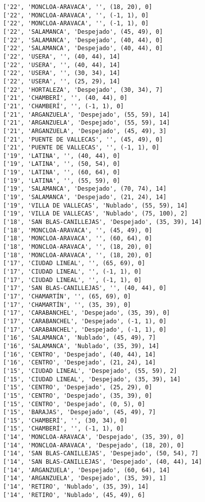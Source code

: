 \documentclass[11pt]{article}
\begin{document}
\begin{Verbatim}[commandchars=\\\{\}]
['22', 'MONCLOA-ARAVACA', '', (18, 20), 0]
['22', 'MONCLOA-ARAVACA', '', (-1, 1), 0]
['22', 'MONCLOA-ARAVACA', '', (-1, 1), 0]
['22', 'SALAMANCA', 'Despejado', (45, 49), 0]
['22', 'SALAMANCA', 'Despejado', (40, 44), 0]
['22', 'SALAMANCA', 'Despejado', (40, 44), 0]
['22', 'USERA', '', (40, 44), 14]
['22', 'USERA', '', (40, 44), 14]
['22', 'USERA', '', (30, 34), 14]
['22', 'USERA', '', (25, 29), 14]
['22', 'HORTALEZA', 'Despejado', (30, 34), 7]
['21', 'CHAMBERÍ', '', (40, 44), 0]
['21', 'CHAMBERÍ', '', (-1, 1), 0]
['21', 'ARGANZUELA', 'Despejado', (55, 59), 14]
['21', 'ARGANZUELA', 'Despejado', (55, 59), 14]
['21', 'ARGANZUELA', 'Despejado', (45, 49), 3]
['21', 'PUENTE DE VALLECAS', '', (45, 49), 0]
['21', 'PUENTE DE VALLECAS', '', (-1, 1), 0]
['19', 'LATINA', '', (40, 44), 0]
['19', 'LATINA', '', (50, 54), 0]
['19', 'LATINA', '', (60, 64), 0]
['19', 'LATINA', '', (55, 59), 0]
['19', 'SALAMANCA', 'Despejado', (70, 74), 14]
['19', 'SALAMANCA', 'Despejado', (21, 24), 14]
['19', 'VILLA DE VALLECAS', 'Nublado', (55, 59), 14]
['19', 'VILLA DE VALLECAS', 'Nublado', (75, 100), 2]
['18', 'SAN BLAS-CANILLEJAS', 'Despejado', (35, 39), 14]
['18', 'MONCLOA-ARAVACA', '', (45, 49), 0]
['18', 'MONCLOA-ARAVACA', '', (60, 64), 0]
['18', 'MONCLOA-ARAVACA', '', (18, 20), 0]
['18', 'MONCLOA-ARAVACA', '', (18, 20), 0]
['17', 'CIUDAD LINEAL', '', (65, 69), 0]
['17', 'CIUDAD LINEAL', '', (-1, 1), 0]
['17', 'CIUDAD LINEAL', '', (-1, 1), 0]
['17', 'SAN BLAS-CANILLEJAS', '', (40, 44), 0]
['17', 'CHAMARTÍN', '', (65, 69), 0]
['17', 'CHAMARTÍN', '', (35, 39), 0]
['17', 'CARABANCHEL', 'Despejado', (35, 39), 0]
['17', 'CARABANCHEL', 'Despejado', (-1, 1), 0]
['17', 'CARABANCHEL', 'Despejado', (-1, 1), 0]
['16', 'SALAMANCA', 'Nublado', (45, 49), 7]
['16', 'SALAMANCA', 'Nublado', (35, 39), 14]
['16', 'CENTRO', 'Despejado', (40, 44), 14]
['16', 'CENTRO', 'Despejado', (21, 24), 14]
['15', 'CIUDAD LINEAL', 'Despejado', (55, 59), 2]
['15', 'CIUDAD LINEAL', 'Despejado', (35, 39), 14]
['15', 'CENTRO', 'Despejado', (25, 29), 0]
['15', 'CENTRO', 'Despejado', (35, 39), 0]
['15', 'CENTRO', 'Despejado', (0, 5), 0]
['15', 'BARAJAS', 'Despejado', (45, 49), 7]
['15', 'CHAMBERÍ', '', (30, 34), 0]
['15', 'CHAMBERÍ', '', (-1, 1), 0]
['14', 'MONCLOA-ARAVACA', 'Despejado', (35, 39), 0]
['14', 'MONCLOA-ARAVACA', 'Despejado', (18, 20), 0]
['14', 'SAN BLAS-CANILLEJAS', 'Despejado', (50, 54), 7]
['14', 'SAN BLAS-CANILLEJAS', 'Despejado', (40, 44), 14]
['14', 'ARGANZUELA', 'Despejado', (60, 64), 14]
['14', 'ARGANZUELA', 'Despejado', (35, 39), 1]
['14', 'RETIRO', 'Nublado', (35, 39), 14]
['14', 'RETIRO', 'Nublado', (45, 49), 6]

\end{Verbatim}
\end{document}
